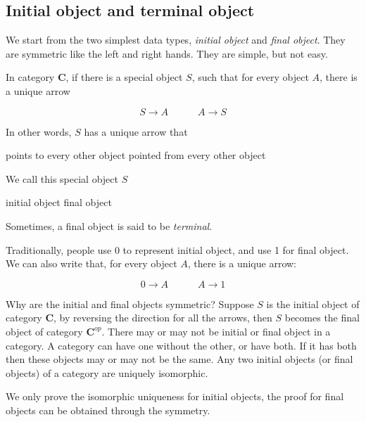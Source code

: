 \documentclass[b5paper]{article}
\begin{document}
\subsection{Initial object and terminal object}
We start from the two simplest data types, {\em initial object} and {\em final object}. They are symmetric like the left and right hands. They are simple, but not easy.

 
\begin{definition}
\normalfont
In category $\pmb{C}$, if there is a special object $S$, such that for every object $A$, there is a unique arrow

\[
  S \longrightarrow A \quad \quad \quad A \longrightarrow S
\]

In other words, $S$ has a unique arrow that

\begin{center}
  points to every other object  \quad \quad \quad pointed from every other object
\end{center}

We call this special object $S$

\begin{center}
  initial object \quad \quad \quad final object
\end{center}

Sometimes, a final object is said to be {\em terminal}.
\end{definition}

Traditionally, people use 0 to represent initial object, and use 1 for final object. We can also write that, for every object $A$, there is a unique arrow:

\[
  0 \longrightarrow A \quad \quad \quad A \longrightarrow 1
\]

Why are the initial and final objects symmetric? Suppose $S$ is the initial object of category $\pmb{C}$, by reversing the direction for all the arrows, then $S$ becomes the final object of category $\pmb{C}^{op}$. There may or may not be initial or final object in a category. A category can have one without the other, or have both. If it has both then these objects may or may not be the same. Any two initial objects (or final objects) of a category are uniquely isomorphic.

We only prove the isomorphic uniqueness for initial objects, the proof for final objects can be obtained through the symmetry.
\end{document}
